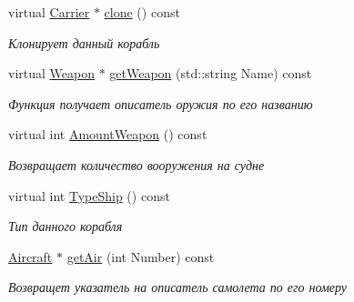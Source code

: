 \begin{DoxyCompactItemize}
virtual \mbox{\hyperlink{class_aircraft_carrier_group_1_1_carrier}{Carrier}} $\ast$ \mbox{\hyperlink{class_aircraft_carrier_group_1_1_carrier_acb567d5ef451d10187f46c34653626e1}{clone}} () const
\begin{DoxyCompactList}\small\item\em Клонирует данный корабль \end{DoxyCompactList}\item 
virtual \mbox{\hyperlink{class_aircraft_carrier_group_1_1_weapon}{Weapon}} $\ast$ \mbox{\hyperlink{class_aircraft_carrier_group_1_1_carrier_a69e4672d2e5b0e7ff0d27e9ec762b828}{get\+Weapon}} (std\+::string Name) const
\begin{DoxyCompactList}\small\item\em Функция получает описатель оружия по его названию \end{DoxyCompactList}\item 
virtual int \mbox{\hyperlink{class_aircraft_carrier_group_1_1_carrier_af6d3cd1b93441f0cdee9c06a8e78bb05}{Amount\+Weapon}} () const
\begin{DoxyCompactList}\small\item\em Возвращает количество вооружения на судне \end{DoxyCompactList}\item 
\mbox{\label{class_aircraft_carrier_group_1_1_carrier_adc8ad419feaed9154a980b447e23a159}} 
virtual int \mbox{\hyperlink{class_aircraft_carrier_group_1_1_carrier_adc8ad419feaed9154a980b447e23a159}{Type\+Ship}} () const
\begin{DoxyCompactList}\small\item\em Тип данного корабля \end{DoxyCompactList}\item 
\mbox{\label{class_aircraft_carrier_group_1_1_carrier_a5140ceccb1365f4e7882c7e2cea7c2a5}} 
\mbox{\hyperlink{class_aircraft_carrier_group_1_1_aircraft}{Aircraft}} $\ast$ \mbox{\hyperlink{class_aircraft_carrier_group_1_1_carrier_a5140ceccb1365f4e7882c7e2cea7c2a5}{get\+Air}} (int Number) const
\begin{DoxyCompactList}\small\item\em Возвращет указатель на описатель самолета по его номеру \end{DoxyCompactList}\item 
\mbox{\label{class_aircraft_carrier_group_1_1_carrier_abd7c7342ef057fc1d14ec9296631cce8}} 

\end{DoxyCompactItemize}
